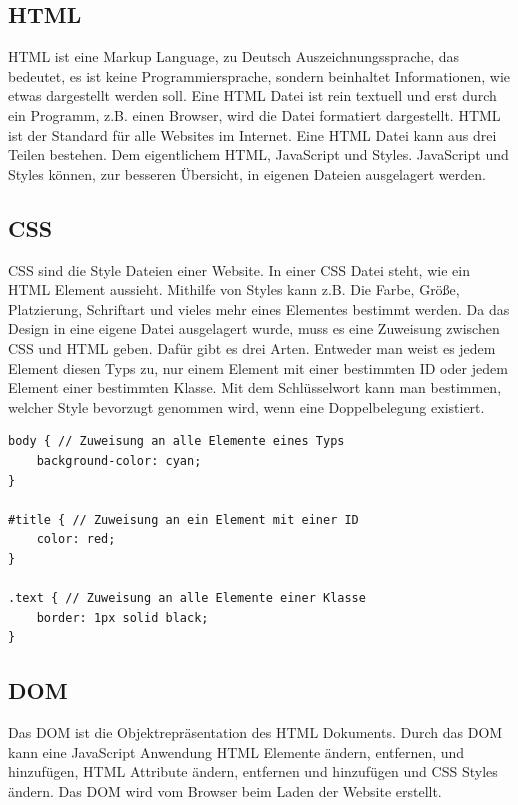 \subsection{HTML}
\label{sec:vor-html}
\ac{HTML} ist eine Markup Language, zu Deutsch Auszeichnungssprache, das bedeutet, es ist keine Programmiersprache, sondern beinhaltet Informationen, wie etwas dargestellt werden soll. Eine \ac{HTML} Datei ist rein textuell und erst durch ein Programm, z.B. einen Browser, wird die Datei formatiert dargestellt. \ac{HTML} ist der Standard für alle Websites im Internet. Eine \ac{HTML} Datei kann aus drei Teilen bestehen. Dem eigentlichem \ac{HTML}, JavaScript und Styles. JavaScript und Styles können, zur besseren Übersicht, in eigenen Dateien ausgelagert werden.

\subsection{CSS}
\ac{CSS} sind die Style Dateien einer Website. In einer \ac{CSS} Datei steht, wie ein \ac{HTML} Element aussieht. Mithilfe von Styles kann z.B. Die Farbe, Größe, Platzierung, Schriftart und vieles mehr eines Elementes bestimmt werden. Da das Design in eine eigene Datei ausgelagert wurde, muss es eine Zuweisung zwischen \ac{CSS} und \ac{HTML} geben. Dafür gibt es drei Arten. Entweder man weist es jedem Element diesen Typs zu, nur einem Element mit einer bestimmten ID oder jedem Element einer bestimmten Klasse. Mit dem Schlüsselwort  kann man bestimmen, welcher Style bevorzugt genommen wird, wenn eine Doppelbelegung existiert.

\begin{lstlisting}[caption=Zuweisen von Design an HTML,style=css,label=CSS-Beispiel]
body { // Zuweisung an alle Elemente eines Typs
	background-color: cyan;
}

#title { // Zuweisung an ein Element mit einer ID
	color: red;
}

.text { // Zuweisung an alle Elemente einer Klasse
	border: 1px solid black;
}
\end{lstlisting}


\subsection{DOM}
\label{sec:vor-dom}
Das \ac{DOM} ist die Objektrepräsentation des \ac{HTML} Dokuments. Durch das \ac{DOM} kann eine JavaScript Anwendung \ac{HTML} Elemente ändern, entfernen, und hinzufügen, \ac{HTML} Attribute ändern, entfernen und hinzufügen und \ac{CSS} Styles ändern. Das \ac{DOM} wird vom Browser beim Laden der Website erstellt. 

